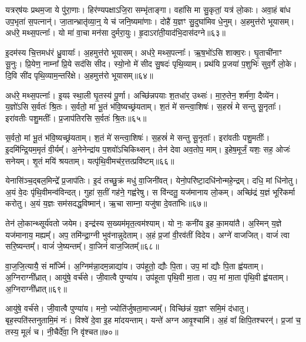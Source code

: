 यत्रर्‌\mbox{}ष॑यः प्रथम॒जा ये पु॑रा॒णाः।
हिर॑ण्यपक्षा\-ऽजि॒रा सम्भृ॑ताङ्गा।
वहा॑सि मा सु॒कृतां॒ यत्र॑ लो॒काः।
अवा॒हं बा॑ध उप॒भृता॑ स॒पत्नान्॑।
जा॒तान्भ्रातृ॑व्या॒न्॒ ये च॑ जनि॒ष्यमा॑णाः।
दोहै॑ य॒ज्ञꣳ सु॒दुघा॑मिव धे॒नुम्।
अ॒हमुत्त॑रो भूयासम्।
अध॑रे॒ मथ्स॒पत्नाः᳚।
यो मा॑ वा॒चा मन॑सा दुर्मरा॒युः।
हृ॒दा\-ऽरा॑ती॒याद॑भि॒दास॑दग्ने॥६३॥

इ॒दम॑स्य चि॒त्तमध॑रं ध्रु॒वायाः᳚।
अ॒हमुत्त॑रो भूयासम्।
अध॑रे॒ मथ्स॒पत्नाः᳚।
ऋ॒ष॒भो॑ऽसि शाक्व॒रः।
घृ॒ताची॑नाꣳ सू॒नुः।
प्रि॒येण॒ नाम्ना᳚ प्रि॒ये सद॑सि सीद।
स्यो॒नो मे॑ सीद सु॒षदः॑ पृथि॒व्याम्।
प्रथ॑यि प्र॒जया॑ प॒शुभिः॑ सुव॒र्गे लो॒के।
दि॒वि सी॑द पृथि॒व्याम॒न्तरि॑क्षे।
अ॒हमुत्त॑रो भूयासम्॥६४॥\phantom{त्त॑}%

अध॑रे॒ मथ्स॒पत्नाः᳚।
इ॒यꣴ स्था॒ली घृ॒तस्य॑ पू॒र्णा।
अच्छि॑न्नपयाः श॒तधा॑र॒ उथ्सः॑।
मा॒रु॒तेन॒ शर्म॑णा॒ दैव्ये॑न।
य॒ज्ञो॑ऽसि स॒र्वतः॑ श्रि॒तः।
स॒र्वतो॒ मां भू॒तं भ॑वि॒ष्यच्छ्र॑यताम्।
श॒तं मे॑ सन्त्वा॒शिषः॑।
स॒हस्रं॑ मे सन्तु सू॒नृताः᳚।
इरा॑वतीः पशु॒मतीः᳚।
प्र॒जा\-प॑तिरसि स॒र्वतः॑ श्रि॒तः॥६५॥

स॒र्वतो॒ मां भू॒तं भ॑वि॒ष्यच्छ्र॑यताम्।
श॒तं मे॑ सन्त्वा॒शिषः॑।
स॒हस्रं॑ मे सन्तु सू॒नृताः᳚।
इरा॑वतीः पशु॒मतीः᳚।
इ॒दमि॑न्द्रि॒यम॒मृतं॑ वी॒र्यम्᳚।
अ॒नेनेन्द्रा॑य प॒शवो॑\-ऽचिकिथ्सन्।
तेन॑ देवा अव॒तोप॒ माम्।
इ॒हेष॒मूर्जं॒ यशः॒ सह॒ ओजः॑ सनेयम्।
शृ॒तं मयि॑ श्रयताम्।
यत्पृ॑थि॒वीमच॑र॒त्तत्प्रवि॑ष्टम्॥६६॥

येनासि॑ञ्च॒द्बल॒मिन्द्रे᳚ प्र॒जा\-प॑तिः।
इ॒दं तच्छु॒क्रं मधु॑ वा॒जिनी॑वत्।
येनो॒परि॑ष्टा॒दधि॑नोन्महे॒न्द्रम्।
दधि॒ मां धि॑नोतु।
अ॒यं वे॒दः पृ॑थि॒वीमन्व॑विन्दत्।
गुहा॑ स॒तीं गह॑ने॒ गह्व॑रेषु।
स वि॑न्दतु॒ यज॑मानाय लो॒कम्।
अच्छि॑द्रं य॒ज्ञं भूरि॑कर्मा करोतु।
अ॒यं य॒ज्ञः सम॑सदद्ध॒विष्मान्॑।
ऋ॒चा साम्ना॒ यजु॑षा दे॒वता॑भिः॥६७॥

तेन॑ लो॒कान्थ्सूर्य॑वतो जयेम।
इन्द्र॑स्य स॒ख्यम॑मृत॒त्वम॑\-श्याम्।
यो नः॒ कनी॑य इ॒ह का॒मया॑तै।
अ॒स्मिन् य॒ज्ञे यज॑मानाय॒ मह्यम्᳚।
अप॒ तमि॑न्द्रा॒ग्नी भुव॑नान्नुदेताम्।
अ॒हं प्र॒जां वी॒रव॑तीं विदेय।
अग्ने॑ वाजजित्।
वाजं॑ त्वा सरि॒ष्यन्तम्᳚।
वाजं॑ जे॒ष्यन्तम्᳚।
वा॒जिनं॑ वाज॒जितम्᳚॥६८॥

वा॒ज॒जि॒त्यायै॒ सं मा᳚र्ज्मि।
अ॒ग्निम॑न्ना॒दम॒न्नाद्या॑य।
उप॑हूतो॒ द्यौः पि॒ता।
उप॒ मां द्यौः पि॒ता ह्व॑यताम्।
अ॒ग्निराग्नी᳚ध्रात्।
आयु॑षे॒ वर्च॑से।
जी॒वात्वै पुण्या॑य।
उप॑हूता पृथि॒वी मा॒ता।
उप॒ मां मा॒ता पृ॑थि॒वी ह्व॑यताम्।
अ॒ग्निराग्नी᳚ध्रात्॥६९॥

आयु॑षे॒ वर्च॑से।
जी॒वात्वै पुण्या॑य।
मनो॒ ज्योति॑र्जुषता॒मा\-ज्यम्᳚।
विच्छि॑न्नं य॒ज्ञꣳ समि॒मं द॑धातु।
बृह॒स्पति॑स्तनुतामि॒मं नः॑।
विश्वे॑ दे॒वा इ॒ह मा॑दयन्ताम्।
यन्ते॑ अग्न आवृ॒श्चामि॑।
अ॒हं वा᳚ क्षिपि॒तश्चरन्॑।
प्र॒जां च॒ तस्य॒ मूलं॑ च।
नी॒चैर्दे॑वा॒ नि वृ॑श्चत॥७०॥

